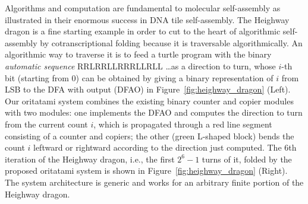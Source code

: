 \documentclass[11pt]{article}
\begin{document}
Algorithms and computation are fundamental to molecular self-assembly as illustrated in their enormous success in DNA tile self-assembly. 
The Heighway dragon is a fine starting example in order to cut to the heart of algorithmic self-assembly by cotranscriptional folding because it is traversable algorithmically. 
An algorithmic way to traverse it is to feed a turtle program with the binary \textit{automatic sequence} RRLRRLLRRRLLRLL \dots as a direction to turn, whose $i$-th bit (starting from 0) can be obtained by giving a binary representation of $i$ from LSB to the DFA with output (DFAO) in Figure~\ref{fig:heighway_dragon} (Left). 
Our oritatami system combines the existing binary counter and copier modules with two modules: 
one implements the DFAO and computes the direction to turn from the current count $i$, which is propagated through a red line segment consisting of a counter and copiers; 
the other (green L-shaped block) bends the count $i$ leftward or rightward according to the direction just computed. 
The 6th iteration of the Heighway dragon, i.e., the first $2^{6}-1$ turns of it, folded by the proposed oritatami system is shown in Figure~\ref{fig:heighway_dragon} (Right). 
The system architecture is generic and works for an arbitrary finite portion of the Heighway dragon. 
\end{document}

